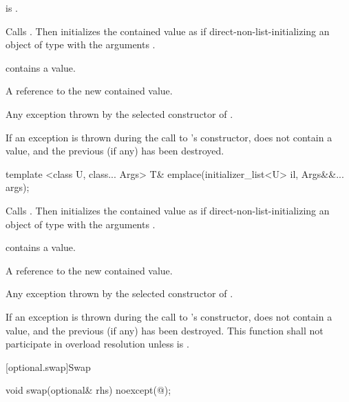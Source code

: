 \begin{itemdescr}
\pnum
\requires
{} is .

\pnum
\effects
Calls . Then initializes the contained value as if direct-non-list-initializing an object of type  with the arguments .

\pnum
\postconditions
{} contains a value.

\pnum
\returns
A reference to the new contained value.

\pnum
\throws
Any exception thrown by the selected constructor of .

\pnum
\remarks
If an exception is thrown during the call to 's constructor,  does not contain a value, and the previous  (if any) has been destroyed.
\end{itemdescr}

%
\begin{itemdecl}
template <class U, class... Args> T& emplace(initializer_list<U> il, Args&&... args);
\end{itemdecl}

\begin{itemdescr}
\pnum
\effects
Calls . Then initializes the contained value as if direct-non-list-initializing an object of type  with the arguments .

\pnum
\postconditions
{} contains a value.

\pnum
\returns
A reference to the new contained value.

\pnum
\throws
Any exception thrown by the selected constructor of .

\pnum
\remarks
If an exception is thrown during the call to 's constructor,  does not contain a value, and the previous  (if any) has been destroyed.
This function shall not participate in overload resolution unless  is .
\end{itemdescr}

[optional.swap]{Swap}

%
\begin{itemdecl}
void swap(optional& rhs) noexcept(@\seebelow@);
\end{itemdecl}


